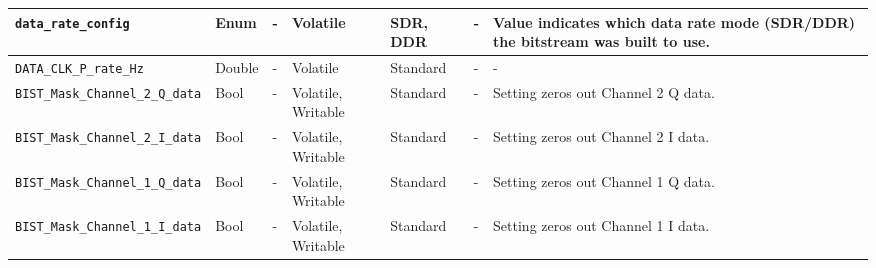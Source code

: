 \documentclass{article}
\begin{document}
\begin{landscape}
\begin{scriptsize}
\begin{longtable}{|p{3.6cm}|p{8.1cm}|p{1.4cm}|p{1.3cm}|p{1.4cm}|p{2.5cm}|p{3.6cm}|}
			\hline
			\verb+data_rate_config+ & Enum & - & Volatile & SDR, DDR & - & Value indicates which data rate mode (SDR/DDR) the bitstream was built to use. \\
			\hline
			\verb+DATA_CLK_P_rate_Hz+ & Double & - & Volatile & Standard & - & - \\
			\hline
			\verb+BIST_Mask_Channel_2_Q_data+ & Bool & - & Volatile, Writable & Standard & - & Setting zeros out Channel 2 Q data. \\
			\hline
			\verb+BIST_Mask_Channel_2_I_data+ & Bool & - & Volatile, Writable & Standard & - & Setting zeros out Channel 2 I data. \\
			\hline
			\verb+BIST_Mask_Channel_1_Q_data+ & Bool & - & Volatile, Writable & Standard & - & Setting zeros out Channel 1 Q data. \\
			\hline
			\verb+BIST_Mask_Channel_1_I_data+ & Bool & - & Volatile, Writable & Standard & - & Setting zeros out Channel 1 I data. \\
			\hline
		\end{longtable}
	\end{scriptsize}

\pagebreak


\end{landscape}
\end{document}
